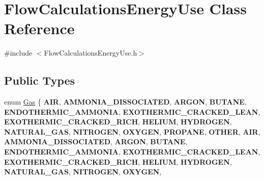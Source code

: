\hypertarget{class_flow_calculations_energy_use}{}\section{Flow\+Calculations\+Energy\+Use Class Reference}
\label{class_flow_calculations_energy_use}


{\ttfamily \#include $<$Flow\+Calculations\+Energy\+Use.\+h$>$}

\subsection*{Public Types}
\begin{DoxyCompactItemize}
\item 
\mbox{\label{class_flow_calculations_energy_use_a840d5a836e7b05d6791b79bace4440f2}} 
enum \hyperlink{class_flow_calculations_energy_use_a840d5a836e7b05d6791b79bace4440f2}{Gas} \{ \newline
{\bfseries A\+IR}, 
{\bfseries A\+M\+M\+O\+N\+I\+A\+\_\+\+D\+I\+S\+S\+O\+C\+I\+A\+T\+ED}, 
{\bfseries A\+R\+G\+ON}, 
{\bfseries B\+U\+T\+A\+NE}, 
\newline
{\bfseries E\+N\+D\+O\+T\+H\+E\+R\+M\+I\+C\+\_\+\+A\+M\+M\+O\+N\+IA}, 
{\bfseries E\+X\+O\+T\+H\+E\+R\+M\+I\+C\+\_\+\+C\+R\+A\+C\+K\+E\+D\+\_\+\+L\+E\+AN}, 
{\bfseries E\+X\+O\+T\+H\+E\+R\+M\+I\+C\+\_\+\+C\+R\+A\+C\+K\+E\+D\+\_\+\+R\+I\+CH}, 
{\bfseries H\+E\+L\+I\+UM}, 
\newline
{\bfseries H\+Y\+D\+R\+O\+G\+EN}, 
{\bfseries N\+A\+T\+U\+R\+A\+L\+\_\+\+G\+AS}, 
{\bfseries N\+I\+T\+R\+O\+G\+EN}, 
{\bfseries O\+X\+Y\+G\+EN}, 
\newline
{\bfseries P\+R\+O\+P\+A\+NE}, 
{\bfseries O\+T\+H\+ER}, 
{\bfseries A\+IR}, 
{\bfseries A\+M\+M\+O\+N\+I\+A\+\_\+\+D\+I\+S\+S\+O\+C\+I\+A\+T\+ED}, 
\newline
{\bfseries A\+R\+G\+ON}, 
{\bfseries B\+U\+T\+A\+NE}, 
{\bfseries E\+N\+D\+O\+T\+H\+E\+R\+M\+I\+C\+\_\+\+A\+M\+M\+O\+N\+IA}, 
{\bfseries E\+X\+O\+T\+H\+E\+R\+M\+I\+C\+\_\+\+C\+R\+A\+C\+K\+E\+D\+\_\+\+L\+E\+AN}, 
\newline
{\bfseries E\+X\+O\+T\+H\+E\+R\+M\+I\+C\+\_\+\+C\+R\+A\+C\+K\+E\+D\+\_\+\+R\+I\+CH}, 
{\bfseries H\+E\+L\+I\+UM}, 
{\bfseries H\+Y\+D\+R\+O\+G\+EN}, 
{\bfseries N\+A\+T\+U\+R\+A\+L\+\_\+\+G\+AS}, 
\newline
{\bfseries N\+I\+T\+R\+O\+G\+EN}, 
{\bfseries O\+X\+Y\+G\+EN}, 

\end{DoxyCompactItemize}
